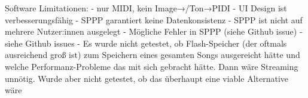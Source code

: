 Software Limitationen: \newline
- nur MIDI, kein Image→/Ton→PIDI \newline
- UI Design ist verbesserungsfähig \newline
- SPPP garantiert keine Datenkonsistenz \newline
- SPPP ist nicht auf mehrere Nutzer:innen ausgelegt \newline
- Mögliche Fehler in SPPP (siehe Github issue) \newline
- siehe Github issues \newline
- Es wurde nicht getestet, ob Flash-Speicher (der oftmals ausreichend groß ist) zum Speichern eines gesamten Songs ausgereicht hätte und welche Performanz-Probleme das mit sich gebracht hätte. Dann wäre Streaming unnötig. Wurde aber nicht getestet, ob das überhaupt eine viable Alternative wäre \newline